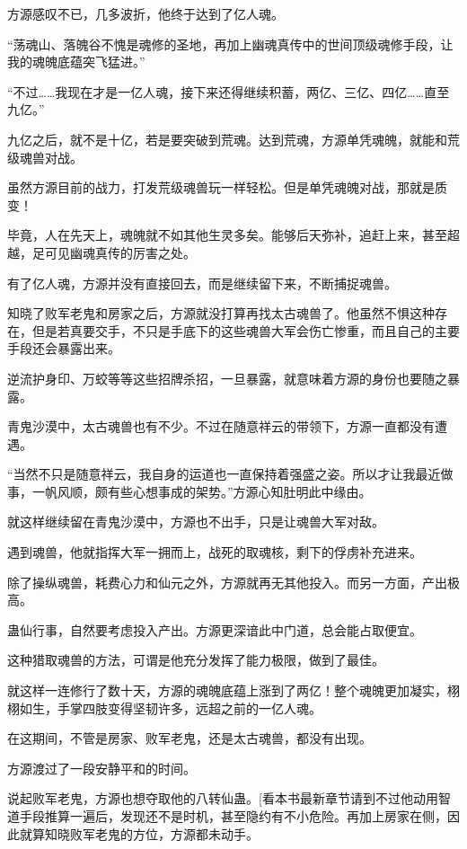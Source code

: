
\begin{this_body}

方源感叹不已，几多波折，他终于达到了亿人魂。

“荡魂山、落魄谷不愧是魂修的圣地，再加上幽魂真传中的世间顶级魂修手段，让我的魂魄底蕴突飞猛进。”

“不过……我现在才是一亿人魂，接下来还得继续积蓄，两亿、三亿、四亿……直至九亿。”

九亿之后，就不是十亿，若是要突破到荒魂。达到荒魂，方源单凭魂魄，就能和荒级魂兽对战。

虽然方源目前的战力，打发荒级魂兽玩一样轻松。但是单凭魂魄对战，那就是质变！

毕竟，人在先天上，魂魄就不如其他生灵多矣。能够后天弥补，追赶上来，甚至超越，足可见幽魂真传的厉害之处。

有了亿人魂，方源并没有直接回去，而是继续留下来，不断捕捉魂兽。

知晓了败军老鬼和房家之后，方源就没打算再找太古魂兽了。他虽然不惧这种存在，但是若真要交手，不只是手底下的这些魂兽大军会伤亡惨重，而且自己的主要手段还会暴露出来。

逆流护身印、万蛟等等这些招牌杀招，一旦暴露，就意味着方源的身份也要随之暴露。

青鬼沙漠中，太古魂兽也有不少。不过在随意祥云的带领下，方源一直都没有遭遇。

“当然不只是随意祥云，我自身的运道也一直保持着强盛之姿。所以才让我最近做事，一帆风顺，颇有些心想事成的架势。”方源心知肚明此中缘由。

就这样继续留在青鬼沙漠中，方源也不出手，只是让魂兽大军对敌。

遇到魂兽，他就指挥大军一拥而上，战死的取魂核，剩下的俘虏补充进来。

除了操纵魂兽，耗费心力和仙元之外，方源就再无其他投入。而另一方面，产出极高。

蛊仙行事，自然要考虑投入产出。方源更深谙此中门道，总会能占取便宜。

这种猎取魂兽的方法，可谓是他充分发挥了能力极限，做到了最佳。

就这样一连修行了数十天，方源的魂魄底蕴上涨到了两亿！整个魂魄更加凝实，栩栩如生，手掌四肢变得坚韧许多，远超之前的一亿人魂。

在这期间，不管是房家、败军老鬼，还是太古魂兽，都没有出现。

方源渡过了一段安静平和的时间。

说起败军老鬼，方源也想夺取他的八转仙蛊。[看本书最新章节请到不过他动用智道手段推算一遍后，发现还不是时机，甚至隐约有不小危险。再加上房家在侧，因此就算知晓败军老鬼的方位，方源都未动手。


\end{this_body}
